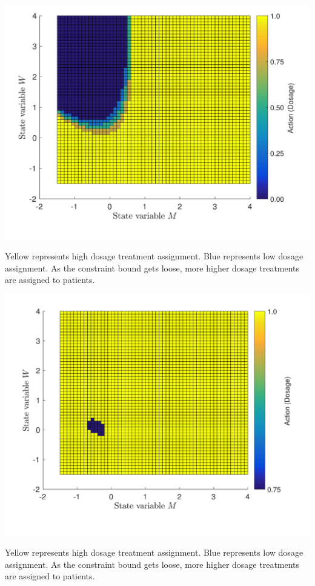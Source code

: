 		\newpage
	\begin{minipage}{0.95\linewidth}
		\includegraphics[width=\linewidth]{./Chapter-3/figs/action_nu15.png}
		\caption*{Yellow represents high dosage treatment assignment. Blue represents low dosage assignment. As the constraint bound gets loose, more higher dosage treatments are assigned to patients.}
	\end{minipage}
		\newpage
	\begin{minipage}{0.95\linewidth}
		\includegraphics[width=\linewidth]{./Chapter-3/figs/action_nu20.png}
		\caption*{Yellow represents high dosage treatment assignment. Blue represents low dosage assignment. As the constraint bound gets loose, more higher dosage treatments are assigned to patients.}
	\end{minipage}
